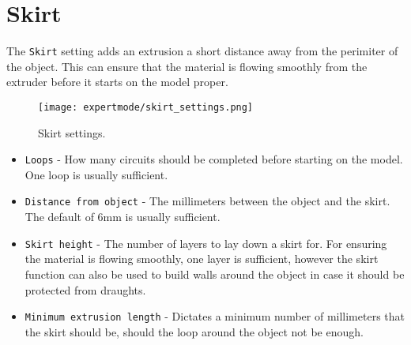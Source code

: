 
\section{Skirt} %
\label{sec:skirt}

The \texttt{Skirt} setting adds an extrusion a short distance away from the perimiter of the object.  This can ensure that the material is flowing smoothly from the extruder before it starts on the model proper.

\begin{figure}[H]
\centering
\texttt{[image: expertmode/skirt\_settings.png]}
\caption{Skirt settings.}
\label{fig:skirt_settings}
\end{figure}

\begin{itemize}
    \item \texttt{Loops} - How many circuits should be completed before starting on the model.  One loop is usually sufficient.
    \item \texttt{Distance from object} - The millimeters between the object and the skirt.  The default of 6mm is usually sufficient.
    \item \texttt{Skirt height} - The number of layers to lay down a skirt for.  For ensuring the material is flowing smoothly, one layer is sufficient, however the skirt function can also be used to build walls around the object in case it should be protected from draughts.
    \item \texttt{Minimum extrusion length} - Dictates a minimum number of millimeters that the skirt should be, should the loop around the object not be enough.
\end{itemize}

